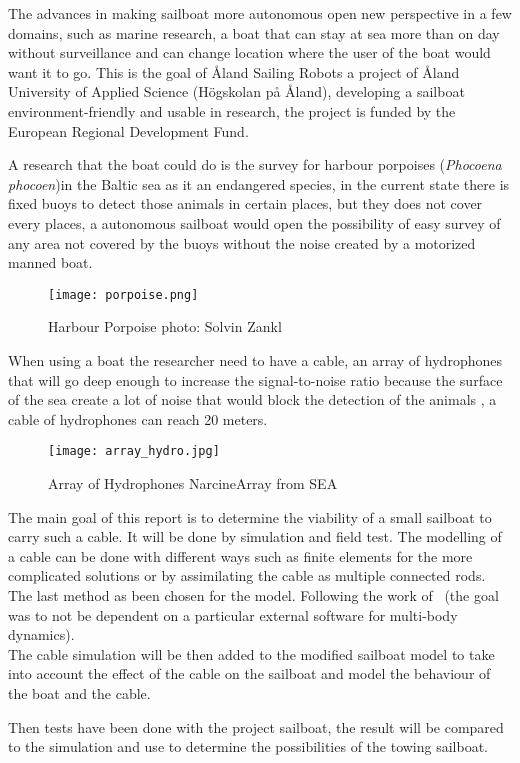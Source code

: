 The advances in making sailboat more autonomous open new perspective in a few domains, such as marine research, a boat that can stay at sea more than on day without surveillance and can change location where the user of the boat would want it to go. This is the goal of \r{A}land Sailing Robots a project of \r{A}land University of Applied Science (H\"{o}gskolan p\r{a} \r{A}land), developing a sailboat environment-friendly and usable in research, the project is funded by the European Regional Development Fund.

A research that the boat could do is the survey for harbour porpoises (\textit{Phocoena phocoen})in the Baltic sea as it an endangered species, in the current state there is fixed buoys to detect those animals in certain places,  but they does not cover every places, a autonomous sailboat would open the possibility of easy survey of any area not covered by the buoys without the noise created by a motorized manned boat.

\begin{figure}[H]
\centering
    \texttt{[image: porpoise.png]}
    \caption{Harbour Porpoise  photo: Solvin Zankl }
    \label{fig:porpoise}
\end{figure}

When using a boat the researcher need to have a cable, an array of hydrophones that will go deep enough to increase the signal-to-noise ratio because the surface of the sea create a lot of noise that would block the detection of the animals , a cable of hydrophones can reach 20 meters.


\begin{figure}[H]
\centering
    \texttt{[image: array\_hydro.jpg]}
    \caption{Array of Hydrophones NarcineArray from SEA }
    \label{fig:arrayHydro}
\end{figure}


The main goal of this report is to determine the viability of a small sailboat to carry such a cable. It will be done by simulation and field test. The modelling of a cable can be done with different ways such as finite elements for the more complicated solutions or by assimilating the cable as multiple connected rods. The last method as been chosen for the model. Following the work of~\cite{johansen2007modelling} (the goal was to not be dependent on a particular external software for multi-body dynamics).\\
The cable simulation will be then added to the modified sailboat model to take into account the effect of
the cable on the sailboat and model the behaviour of the boat and the cable.

Then tests have been done with the project sailboat, the result will be compared to the simulation and use to determine the possibilities of the towing sailboat.